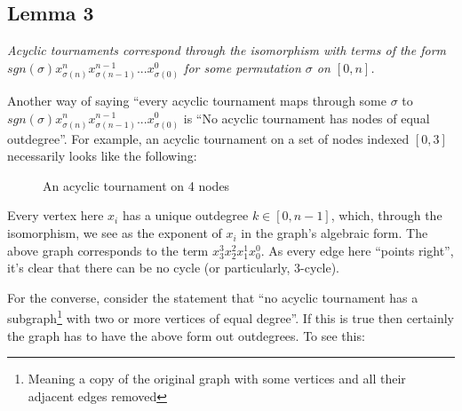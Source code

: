 \documentclass[11pt, oneside]{article} 	%
\begin{document}
\subsection{Lemma 3}

\emph{Acyclic tournaments correspond through the isomorphism with terms of the form $sgn(\sigma) x_{\sigma(n)}^nx_{\sigma(n-1)}^{n-1}  ... x_{\sigma(0)}^{0}$ for some permutation $\sigma$ on $[0,n]$.}


Another way of saying ``every acyclic tournament maps through some $\sigma$ to$sgn(\sigma) x_{\sigma(n)}^nx_{\sigma(n-1)}^{n-1}  ... x_{\sigma(0)}^{0}$ is ``No acyclic tournament has nodes of equal outdegree''.  For example, an acyclic tournament on a set of nodes indexed $[0, 3]$ necessarily looks like the following:

\begin{figure}
\caption{An acyclic tournament on 4 nodes}
\label{fig:test2}
\end{figure}


Every vertex here $x_i$ has a unique outdegree $k \in [0,n-1]$, which, through the isomorphism, we see as the exponent of $x_i$ in the graph's algebraic form.  The above graph corresponds to the term $x_3^3x_2^2x_1^1x_0^0$.  As every edge here ``points right'', it's clear that there can be no cycle (or particularly, 3-cycle).

For the converse, consider the statement that ``no acyclic tournament has a subgraph\footnote{Meaning a copy of the original graph with some vertices and all their adjacent edges removed} with two or more vertices of equal degree''.  If this is true then certainly the graph has to have the above form out outdegrees.  To see this:
\end{document}
